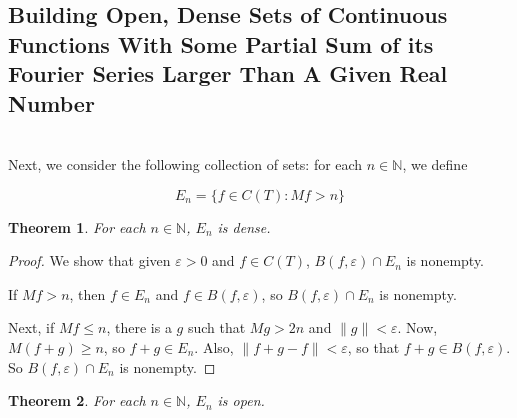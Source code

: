 \documentclass{amsart}
\newcommand{\vep}{\varepsilon}
\newcommand{\N}{\mathbb{N}}
\newcommand{\norm}[1]{\|#1\|}
\newtheorem{thm}{Theorem}[section]
\theoremstyle{definition}
\begin{document}
\subsection{Building Open, Dense Sets of Continuous Functions With Some Partial Sum of its Fourier Series Larger Than A Given Real Number} \hspace*{\fill}\\

Next, we consider the following collection of sets: for each $n \in \N$, we define

\begin{displaymath}
E_n = \{f \in C(T) : Mf > n\}
\end{displaymath}

\begin{thm}
For each $n \in \N$, $E_n$ is dense.
\end{thm}

\begin{proof}

We show that given $\vep>0$ and $f \in C(T)$, $B(f,\vep) \cap E_n$ is nonempty. 

If $Mf > n$, then $f \in E_n$ and $f \in B(f, \vep)$, so $B(f, \vep) \cap E_n$ is nonempty.

Next, if $Mf \leq n$, there is a $g$ such that $Mg > 2n$ and $\norm{g} < \vep$. 
Now, $M(f+g) \geq n$, so $f+g \in E_n$. 
Also, $\norm{f+g -f} < \vep$, so that $f+g \in B(f, \vep)$. 
So $B(f, \vep) \cap E_n$ is nonempty.

\end{proof}

\begin{thm}
For each $n \in \N$, $E_n$ is open.
\end{thm}
\end{document}

